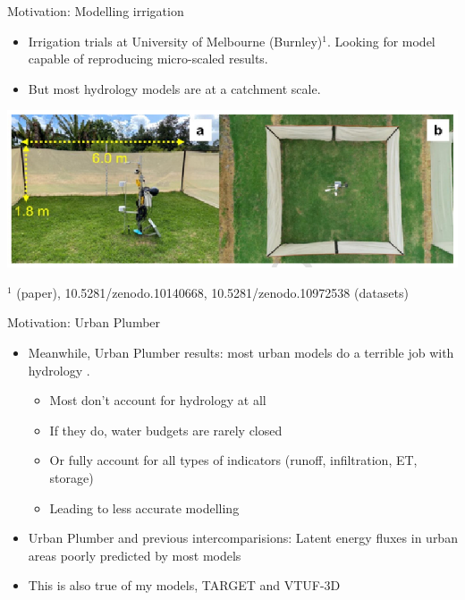 \documentclass{beamer}
\begin{document}
\begin{frame}{Motivation: Modelling irrigation} 

\begin{itemize}
\item Irrigation trials at University of Melbourne (Burnley)$^{1}$. Looking for model capable of reproducing micro-scaled results.\\ 
\item But most hydrology models are at a catchment scale.
\end{itemize}
\begin{center}
\includegraphics[scale=0.60]{Screenshot_20250703_100546.png}
\end{center}
{\tiny $^{1}$\cite{Cheung2024} (paper), 10.5281/zenodo.10140668, 10.5281/zenodo.10972538 (datasets)}
\end{frame}






\begin{frame}{Motivation: Urban Plumber} 
\begin{itemize}

\item Meanwhile, Urban Plumber results: most urban models do a terrible job with hydrology {\footnotesize \citep{jongen_water_2024}}.
\begin{itemize}
\item Most don't account for hydrology at all
\item If they do, water budgets are rarely closed
\item Or fully account for all types of indicators (runoff, infiltration, ET, storage)
\item Leading to less accurate modelling
\end{itemize}
\item Urban Plumber and previous intercomparisions: Latent energy fluxes in urban areas poorly predicted by most models {\footnotesize \citep{lipson_evaluation_2024,grimmond_initial_2011}}
\item This is also true of my models, TARGET {\footnotesize \citep{Broadbent2019}} and VTUF-3D {\footnotesize \citep{Nice2018}}
\end{itemize}
\end{frame}
\end{document}
